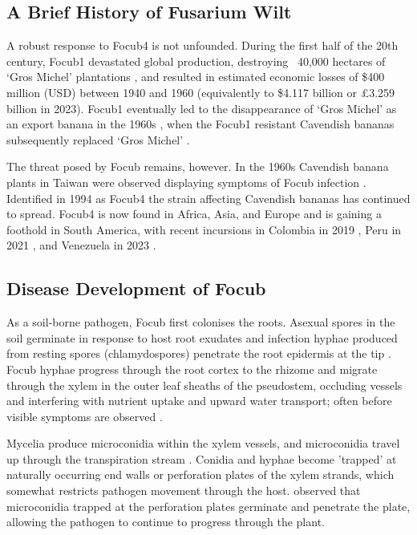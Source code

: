\subsection{A Brief History of Fusarium Wilt}
\label{chap1:focHistory}
A robust response to \ac{Focub4} is not unfounded. During the first half of the 20th century, \ac{Focub1} devastated global production, destroying  ~40,000 hectares of ‘Gros Michel’ plantations \parencite{Agrios2005, Kema2021}, and resulted in estimated economic losses of \$400 million (USD) between 1940 and 1960 (equivalently to \$4.117 billion or £3.259 billion in 2023)\parencite{Ploetz2005}. \ac{Focub1} eventually led to the disappearance of ‘Gros Michel’ as an export banana in the 1960s \parencite{Molina2007}, when the \ac{Focub1} resistant Cavendish bananas subsequently replaced ‘Gros Michel’ \parencite{Ordonez2015a}. 

The threat posed by \ac{Focub} remains, however. In the 1960s Cavendish banana plants in Taiwan were observed displaying symptoms of \ac{Focub} infection \parencite{Agrios2005}. Identified in 1994 as \ac{Focub4} \parencite{Ploetz1994} the strain affecting Cavendish bananas has continued to spread. \Ac{Focub4} is now found in Africa, Asia, and Europe \parencite{Ploetz2015a, Thangavelu2019} and is gaining a foothold in South America, with recent incursions in Colombia in 2019 \parencite{Garcia-Bastidas2019}, Peru in 2021 \parencite{Acuna2022}, and Venezuela in 2023 \parencite{Herrera2023}.

\subsection{Disease Development of \acl{Focub}}

As a soil-borne pathogen, \ac{Focub} first colonises the roots. Asexual spores in the soil germinate in response to host root exudates and infection hyphae produced from resting spores (chlamydospores) penetrate the root epidermis at the tip \parencite{Li2011}. \ac{Focub} hyphae progress through the root cortex to the rhizome and migrate through the xylem in the outer leaf sheaths of the pseudostem, occluding vessels and interfering with nutrient uptake and upward water transport; often before visible symptoms are observed \parencite{Li2017, Warman2018}. 

Mycelia produce microconidia within the xylem vessels, and microconidia travel up through the transpiration stream \parencite{okungbowa2012fusarium}. Conidia and hyphae become 'trapped' at naturally occurring end walls or perforation plates of the xylem strands, which somewhat restricts pathogen movement through the host. \textcite{vandermolen1977vascular} observed that microconidia trapped at the perforation plates germinate and penetrate the plate, allowing the pathogen to continue to progress through the plant.


